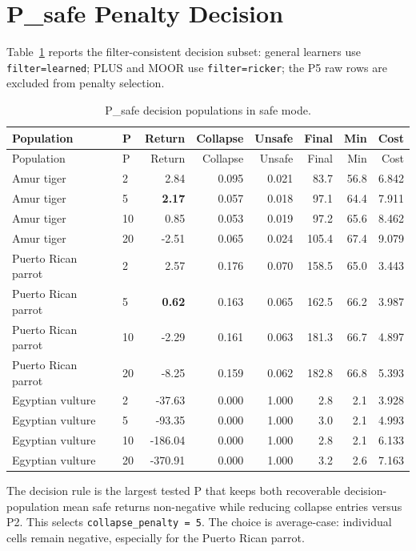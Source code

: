 \documentclass[11pt]{article}
\begin{document}
\section{P\_safe Penalty Decision}

Table~\ref{tab:psafe} reports the filter-consistent decision subset: general
learners use \texttt{filter=learned}; PLUS and MOOR use \texttt{filter=ricker};
the P5 raw rows are excluded from penalty selection.

\begin{longtable}{llrrrrrr}
\caption{P\_safe decision populations in safe mode.}\label{tab:psafe}\\
\toprule
Population & P & Return & Collapse & Unsafe & Final & Min & Cost \\
\midrule
\endfirsthead
\toprule
Population & P & Return & Collapse & Unsafe & Final & Min & Cost \\
\midrule
\endhead
Amur tiger & 2 & 2.84 & 0.095 & 0.021 & 83.7 & 56.8 & 6.842 \\
Amur tiger & 5 & \textbf{2.17} & 0.057 & 0.018 & 97.1 & 64.4 & 7.911 \\
Amur tiger & 10 & 0.85 & 0.053 & 0.019 & 97.2 & 65.6 & 8.462 \\
Amur tiger & 20 & -2.51 & 0.065 & 0.024 & 105.4 & 67.4 & 9.079 \\
Puerto Rican parrot & 2 & 2.57 & 0.176 & 0.070 & 158.5 & 65.0 & 3.443 \\
Puerto Rican parrot & 5 & \textbf{0.62} & 0.163 & 0.065 & 162.5 & 66.2 & 3.987 \\
Puerto Rican parrot & 10 & -2.29 & 0.161 & 0.063 & 181.3 & 66.7 & 4.897 \\
Puerto Rican parrot & 20 & -8.25 & 0.159 & 0.062 & 182.8 & 66.8 & 5.393 \\
Egyptian vulture & 2 & -37.63 & 0.000 & 1.000 & 2.8 & 2.1 & 3.928 \\
Egyptian vulture & 5 & -93.35 & 0.000 & 1.000 & 3.0 & 2.1 & 4.993 \\
Egyptian vulture & 10 & -186.04 & 0.000 & 1.000 & 2.8 & 2.1 & 6.133 \\
Egyptian vulture & 20 & -370.91 & 0.000 & 1.000 & 3.2 & 2.6 & 7.163 \\
\bottomrule
\end{longtable}

The decision rule is the largest tested P that keeps both recoverable
decision-population mean safe returns non-negative while reducing collapse
entries versus P2. This selects \texttt{collapse\_penalty = 5}. The choice is
average-case: individual cells remain negative, especially for the Puerto Rican
parrot.
\end{document}
